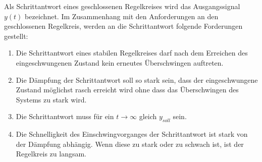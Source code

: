 Als Schrittantwort  eines geschlossenen  Regelkreises wird  das Ausgangssignal
$y(t)$ bezeichnet. Im Zusammenhang mit  den Anforderungen an den geschlossenen
Regelkreis, werden an die Schrittantwort folgende Forderungen gestellt:
\begin{enumerate}
    \item
    Die Schrittantwort eines stabilen Regelkreises darf nach dem Erreichen des
    eingeschwungenen Zustand kein erneutes \"Uberschwingen auftreten.
    \item
        Die  D\"ampfung  der  Schrittantwort  soll so  stark  sein,  dass  der
        eingeschwungene Zustand m\"oglichst rasch  erreicht wird ohne dass das
        \"Uberschwingen des Systems zu stark wird.
    \item
        Die   Schrittantwort  muss   f\"ur  ein   $t\rightarrow\infty$  gleich
        $y_{soll}$ sein.
    \item
        Die Schnelligkeit des Einschwingvorganges der Schrittantwort ist stark
        von der  D\"ampfung abh\"angig. Wenn  diese zu  stark oder  zu schwach
        ist, ist der Regelkreis zu langsam.
\end{enumerate}
